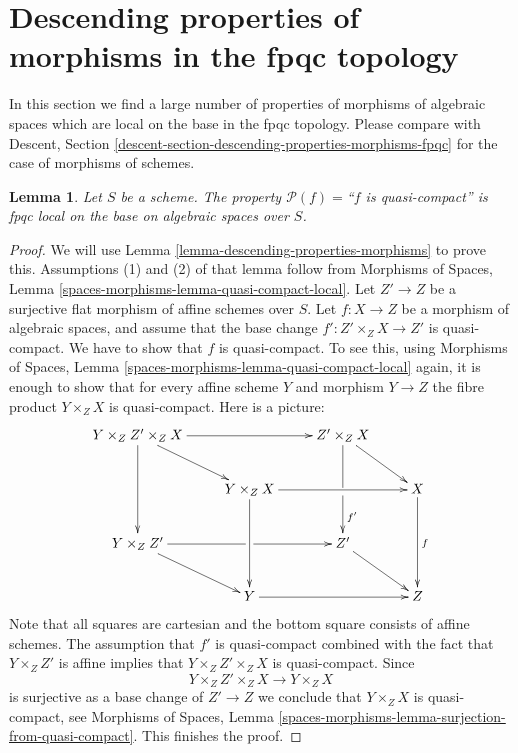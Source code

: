 \documentclass{stacks-project}
\theoremstyle{plain}
\newtheorem{lemma}[subsection]{Lemma}
\theoremstyle{definition}
\theoremstyle{remark}
\numberwithin{equation}{subsection}
\begin{document}
\section{Descending properties of morphisms in the fpqc topology}
\label{section-descending-properties-morphisms-fpqc}


\noindent
In this section we find a large number of properties
of morphisms of algebraic spaces which are local on the base
in the fpqc topology. Please compare with
Descent, Section \ref{descent-section-descending-properties-morphisms-fpqc}
for the case of morphisms of schemes.

\begin{lemma}
\label{lemma-descending-property-quasi-compact}
Let $S$ be a scheme.
The property $\mathcal{P}(f) =$``$f$ is quasi-compact''
is fpqc local on the base on algebraic spaces over $S$.
\end{lemma}

\begin{proof}
We will use
Lemma \ref{lemma-descending-properties-morphisms}
to prove this. Assumptions (1) and (2) of that lemma follow from
Morphisms of Spaces,
Lemma \ref{spaces-morphisms-lemma-quasi-compact-local}.
Let $Z' \to Z$ be a surjective flat morphism of affine schemes over $S$.
Let $f : X \to Z$ be a morphism of algebraic spaces, and assume
that the base change $f' : Z' \times_Z X \to Z'$ is quasi-compact. We have
to show that $f$ is quasi-compact. To see this, using
Morphisms of Spaces,
Lemma \ref{spaces-morphisms-lemma-quasi-compact-local}
again, it is enough to show that for every affine scheme $Y$ and
morphism $Y \to Z$ the fibre product $Y \times_Z X$ is quasi-compact.
Here is a picture:
\begin{equation}
\label{equation-cube}
\vcenter{
\xymatrix{
Y \times_Z Z' \times_Z X \ar[dd] \ar[rr] \ar[rd] & &
Z' \times_Z X \ar'[d][dd]^{f'} \ar[rd] \\
& Y \times_Z X \ar[dd] \ar[rr] & & X \ar[dd]^f \\
Y \times_Z Z' \ar'[r][rr] \ar[rd] & & Z' \ar[rd] \\
& Y \ar[rr] & & Z
}
}
\end{equation}
Note that all squares are cartesian and the bottom square consists
of affine schemes. The assumption that $f'$ is quasi-compact combined with
the fact that $Y \times_Z Z'$ is affine implies that
$Y \times_Z Z' \times_Z X$ is quasi-compact. Since
$$
Y \times_Z Z' \times_Z X \longrightarrow Y \times_Z X
$$
is surjective as a base change of $Z' \to Z$
we conclude that $Y \times_Z X$ is quasi-compact, see
Morphisms of Spaces,
Lemma \ref{spaces-morphisms-lemma-surjection-from-quasi-compact}.
This finishes the proof.
\end{proof}
\end{document}
